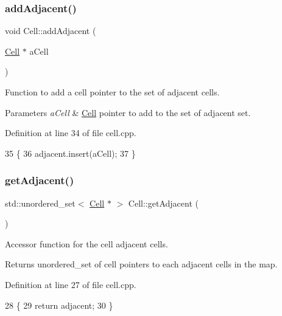 \subsubsection{\texorpdfstring{add\+Adjacent()}{addAdjacent()}}
{\footnotesize\ttfamily void Cell\+::add\+Adjacent (\begin{DoxyParamCaption}\item[{\hyperlink{class_cell}{Cell} $\ast$}]{a\+Cell }\end{DoxyParamCaption})}

Function to add a cell pointer to the set of adjacent cells. 
\begin{DoxyParams}{Parameters}
{\em a\+Cell} & \hyperlink{class_cell}{Cell} pointer to add to the set of adjacent set. \\
\hline
\end{DoxyParams}


Definition at line 34 of file cell.\+cpp.


\begin{DoxyCode}
35 \{
36     adjacent.insert(aCell);
37 \}
\end{DoxyCode}
\hypertarget{class_cell_a9912ab381441093706286584eff721fa}{}\label{class_cell_a9912ab381441093706286584eff721fa} 
\subsubsection{\texorpdfstring{get\+Adjacent()}{getAdjacent()}}
{\footnotesize\ttfamily std\+::unordered\+\_\+set$<$ \hyperlink{class_cell}{Cell} $\ast$ $>$ Cell\+::get\+Adjacent (\begin{DoxyParamCaption}{ }\end{DoxyParamCaption})}

Accessor function for the cell adjacent cells. \begin{DoxyReturn}{Returns}
unordered\+\_\+set of cell pointers to each adjacent cells in the map. 
\end{DoxyReturn}


Definition at line 27 of file cell.\+cpp.


\begin{DoxyCode}
28 \{
29     \textcolor{keywordflow}{return} adjacent;
30 \}
\end{DoxyCode}
\hypertarget{class_cell_a4c9b2812a2d37e17c1a473e8b905d048}{}\label{class_cell_a4c9b2812a2d37e17c1a473e8b905d048} 
